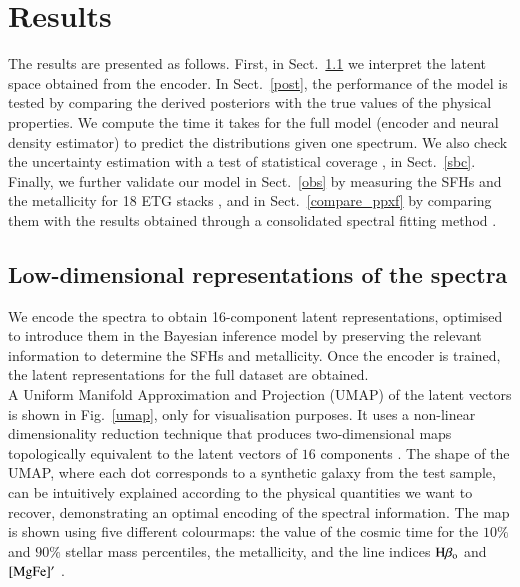 
\section{Results}
\label{results}

The results are presented as follows. First, in Sect.~\ref{encoding} we interpret the latent space obtained from the encoder. In Sect.~\ref{post},  the performance of the model is tested by  comparing the derived posteriors with the true values of the physical properties. We compute the time it takes for the full model (encoder and neural density estimator) to predict the distributions given one spectrum. We also check the uncertainty estimation with a test of statistical coverage \citep{talts2020validating}, in Sect.~\ref{sbc}. Finally, we further validate our model in Sect.~\ref{obs} by measuring the SFHs and the metallicity for 18 ETG stacks \citep{La_Barbera_2013}, and in Sect.~\ref{compare_ppxf} by comparing them with the results obtained through a consolidated spectral fitting method \citep{Cappellari2022}.

\subsection{Low-dimensional representations of the spectra}

\label{encoding}

We encode the spectra to obtain 16-component latent representations, optimised to introduce them in the Bayesian inference model by preserving the relevant information to  determine the SFHs and metallicity. Once the encoder is trained, the latent representations for the full dataset are obtained. \\

A Uniform Manifold Approximation and Projection (UMAP) of the latent vectors is shown in Fig.~\ref{umap}, only for visualisation purposes. It uses a non-linear dimensionality reduction technique that produces two-dimensional maps topologically equivalent to the latent vectors of $16$ components \citep[see][]{umap}. The shape of the UMAP, where each dot corresponds to a synthetic galaxy from the test sample, can be intuitively explained according to the physical quantities we want to recover, demonstrating an optimal encoding of the spectral information. The map is shown using five different colourmaps: the value of the cosmic time for the $10\%$ and $90\%$ stellar mass percentiles, the metallicity, and the line indices  $\rm H{\beta_{o}}$ \citep{cervantes09} and $[\rm{MgFe}]^{\prime}$  \citep{thomas03}.\\

